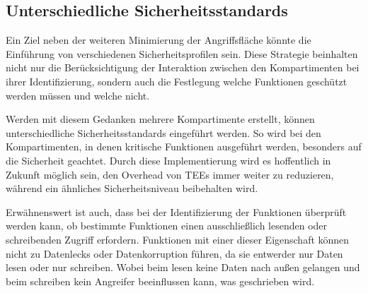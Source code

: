 \subsection{Unterschiedliche Sicherheitsstandards}
Ein Ziel neben der weiteren Minimierung der Angriffsfläche könnte die Einführung von verschiedenen Sicherheitsprofilen sein. Diese Strategie beinhalten nicht nur die Berücksichtigung der Interaktion zwischen den Kompartimenten bei ihrer Identifizierung, sondern auch die Festlegung welche Funktionen geschützt werden müssen und welche nicht.

Werden mit diesem Gedanken mehrere Kompartimente erstellt, können unterschiedliche Sicherheitsstandards eingeführt werden. So wird bei den Kompartimenten, in denen kritische Funktionen ausgeführt werden, besonders auf die Sicherheit geachtet. Durch diese Implementierung wird es hoffentlich in Zukunft möglich sein, den Overhead von TEEs immer weiter zu reduzieren, während ein ähnliches Sicherheitsniveau beibehalten wird.

Erwähnenswert ist auch, dass bei der Identifizierung der Funktionen überprüft werden kann, ob bestimmte Funktionen einen ausschließlich lesenden oder schreibenden Zugriff erfordern. Funktionen mit einer dieser Eigenschaft können nicht zu Datenlecks oder Datenkorruption führen, da sie entwerder nur Daten lesen oder nur schreiben. Wobei beim lesen keine Daten nach außen gelangen und beim schreiben kein Angreifer beeinflussen kann, was geschrieben wird. 
